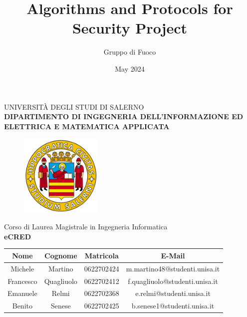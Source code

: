 \documentclass[a4paper, oneside]{book}
\title{Algorithms and Protocols for Security Project}
\author{Gruppo di Fuoco}
\date{May 2024}
\begin{document}
    \begin{titlepage}
        \begin{center}
            \LARGE{\uppercase{Università degli Studi di Salerno}}\\
            \vspace{5mm}
        	\uppercase{\normalsize \textbf{Dipartimento di Ingegneria dell'Informazione ed Elettrica e Matematica Applicata} }\\
        \end{center}
        
        \begin{figure}[H]
            \centering
            \includegraphics[width=0.35\textwidth]{logo_unisa}
        \end{figure}
        
        \begin{center}
        	\normalsize{ Corso di Laurea Magistrale in Ingegneria Informatica }\\
        	\vspace{15mm}
            {\LARGE{\bf \textbf{eCRED}}}\\
        	\vspace{3mm}
        \end{center}
        
        \vspace{15mm}

        \begin{center}
            \begin{tabular}{ | c | c | c | c |} \hline
                \textbf{Nome} & \textbf{Cognome} & \textbf{Matricola} & \textbf{E-Mail} \\ \hline
                    Michele & Martino & 0622702424 & m.martino48@studenti.unisa.it \\
                    \hline
                    Francesco & Quagliuolo & 0622702412 & f.quagliuolo@studenti.unisa.it \\
                    \hline
                    Emanuele & Relmi & 0622702368 & e.relmi@studenti.unisa.it \\
                    \hline
                    Benito & Senese & 0622702425 & b.senese1@studenti.unisa.it \\
                    \hline
                \end{tabular}
            \end{center}
        

\end{titlepage}
\end{document}
